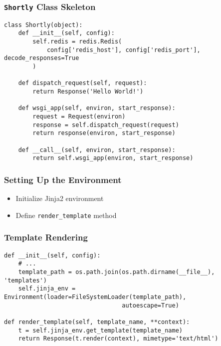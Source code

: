 \documentclass{beamer}
\begin{document}
\begin{frame}[fragile]
\frametitle{\texttt{Shortly} Class Skeleton}
\begin{verbatim}
class Shortly(object):
    def __init__(self, config):
        self.redis = redis.Redis(
            config['redis_host'], config['redis_port'], decode_responses=True
        )

    def dispatch_request(self, request):
        return Response('Hello World!')

    def wsgi_app(self, environ, start_response):
        request = Request(environ)
        response = self.dispatch_request(request)
        return response(environ, start_response)

    def __call__(self, environ, start_response):
        return self.wsgi_app(environ, start_response)
\end{verbatim}
\end{frame}
\begin{frame}
\frametitle{Setting Up the Environment}
\begin{itemize}
    \item Initialize Jinja2 environment
    \item Define \texttt{render\_template} method
\end{itemize}
\end{frame}

\begin{frame}[fragile]
\frametitle{Template Rendering}
\begin{verbatim}
def __init__(self, config):
    # ...
    template_path = os.path.join(os.path.dirname(__file__), 'templates')
    self.jinja_env = Environment(loader=FileSystemLoader(template_path),
                                 autoescape=True)

def render_template(self, template_name, **context):
    t = self.jinja_env.get_template(template_name)
    return Response(t.render(context), mimetype='text/html')
\end{verbatim}
\end{frame}
\end{document}
